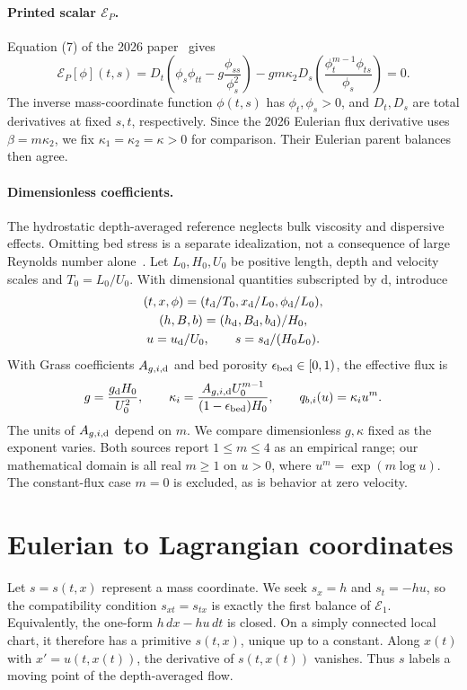 \documentclass[12pt,a4paper,oneside]{report}
\numberwithin{equation}{chapter}
\theoremstyle{definition}
\theoremstyle{remark}\newtheorem{remark}[theorem]{Remark}
\newif\ifreviewmarks
\DeclareRobustCommand{\review}[1]{{\ifreviewmarks\color{authorblue}\fi #1}}
\begin{document}
\paragraph{Printed scalar $\mathcal E_P$.}
Equation (7) of the 2026 paper~\cite{sve2026} gives
\begin{equation}\label{eq:P}
 \mathcal E_P[\phi](t,s)=D_t\left(\phi_s\phi_{tt}
       -g\frac{\phi_{ss}}{\phi_s^2}\right)
       -gm\kappa_2 D_s\left(\frac{\phi_t^{m-1}\phi_{ts}}{\phi_s}\right)=0 .
\end{equation}
The inverse mass-coordinate function $\phi(t,s)$ has $\phi_t,\phi_s>0$, and $D_t,D_s$ are total derivatives at fixed $s,t$, respectively. Since the 2026 Eulerian flux derivative uses $\beta=m\kappa_2$, we fix $\kappa_1=\kappa_2=\kappa>0$ for comparison. Their Eulerian parent balances then agree.

\paragraph{Dimensionless coefficients.}
\review{The hydrostatic depth-averaged reference neglects bulk viscosity and dispersive effects. Omitting bed stress is a separate idealization, not a consequence of large Reynolds number alone~\cite{fernandez2017}. Let $L_0,H_0,U_0$ be positive length, depth and velocity scales and $T_0=L_0/U_0$. With dimensional quantities subscripted by $\mathrm d$, introduce}
\[
 \begin{gathered}
 (t,x,\phi)=(t_{\rm d}/T_0,x_{\rm d}/L_0,\phi_{\rm d}/L_0),\\
 (h,B,b)=(h_{\rm d},B_{\rm d},b_{\rm d})/H_0,\\
 u=u_{\rm d}/U_0,\qquad s=s_{\rm d}/(H_0 L_0).
 \end{gathered}
\]
With Grass coefficients $A_{g,i,\rm d}$ and bed porosity $\epsilon_{\rm bed}\in[0,1)$, the effective flux is
\begin{equation}\label{eq:dimensionless-params}
 g=\frac{g_{\rm d}H_0}{U_0^2},\qquad
 \kappa_i=\frac{A_{g,i,\rm d}U_0^{m-1}}{(1-\epsilon_{\rm bed})H_0},
 \qquad q_{b,i}(u)=\kappa_i u^m .
\end{equation}
\review{The units of $A_{g,i,\rm d}$ depend on $m$. We compare dimensionless $g,\kappa$ fixed as the exponent varies. Both sources report $1\le m\le4$ as an empirical range; our mathematical domain is all real $m\ge1$ on $u>0$, where $u^m=\exp(m\log u)$. The constant-flux case $m=0$ is excluded, as is behavior at zero velocity.}

\section{Eulerian to Lagrangian coordinates}\label{sec:material}
Let $s=s(t,x)$ represent a mass coordinate. We seek $s_x=h$ and $s_t=-hu$, so the compatibility condition $s_{xt}=s_{tx}$ is exactly the first balance of $\mathcal E_1$. Equivalently, the one-form $h\,dx-hu\,dt$ is closed. On a simply connected local chart, it therefore has a primitive $s(t,x)$, unique up to a constant. Along $x(t)$ with $x'=u(t,x(t))$, the derivative of $s(t,x(t))$ vanishes. Thus $s$ labels a moving point of the depth-averaged flow.
\end{document}
